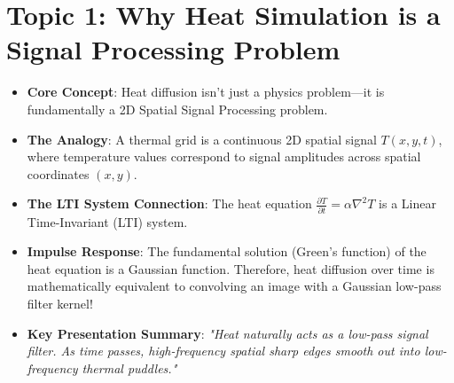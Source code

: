 \documentclass[11pt]{book}
\begin{document}
\section{Topic 1: Why Heat Simulation is a Signal Processing Problem}
\begin{itemize}
    \item \textbf{Core Concept}: Heat diffusion isn't just a physics problem—it is fundamentally a 2D Spatial Signal Processing problem.
    \item \textbf{The Analogy}: A thermal grid is a continuous 2D spatial signal $T(x,y,t)$, where temperature values correspond to signal amplitudes across spatial coordinates $(x,y)$.
    \item \textbf{The LTI System Connection}: The heat equation $\frac{\partial T}{\partial t} = \alpha \nabla^2 T$ is a Linear Time-Invariant (LTI) system. 
    \item \textbf{Impulse Response}: The fundamental solution (Green's function) of the heat equation is a Gaussian function. Therefore, heat diffusion over time is mathematically equivalent to convolving an image with a Gaussian low-pass filter kernel!
    \item \textbf{Key Presentation Summary}: \textit{"Heat naturally acts as a low-pass signal filter. As time passes, high-frequency spatial sharp edges smooth out into low-frequency thermal puddles."}
\end{itemize}
\end{document}
